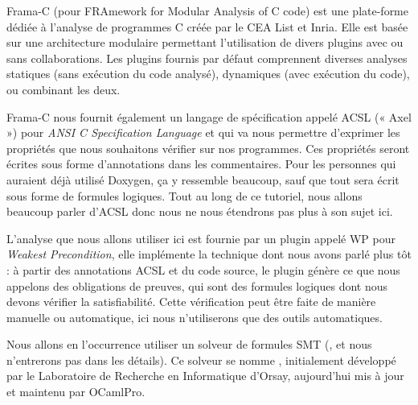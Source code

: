 

\begin{center}


\end{center}




Frama-C (pour FRAmework for Modular Analysis of C code) est une plate-forme
 dédiée à l'analyse de programmes C créée par le CEA List et Inria. Elle est 
 basée sur une architecture modulaire permettant l'utilisation de divers 
 plugins avec ou sans collaborations. Les plugins fournis par défaut 
 comprennent diverses analyses statiques (sans exécution du code analysé), 
 dynamiques (avec exécution du code), ou combinant les deux.



Frama-C nous fournit également un langage de spécification appelé ACSL (« Axel »)
pour \textit{ANSI C Specification Language} et qui va nous permettre d'exprimer les 
propriétés que nous souhaitons vérifier sur nos programmes. Ces propriétés seront
écrites sous forme d'annotations dans les commentaires. Pour les personnes qui 
auraient déjà utilisé Doxygen, ça y ressemble beaucoup, sauf que tout sera 
écrit sous forme de formules logiques. Tout au long de ce tutoriel, nous allons 
beaucoup parler d'ACSL donc nous ne nous étendrons pas plus à son sujet ici.



L'analyse que nous allons utiliser ici est fournie par un plugin appelé WP pour
\textit{Weakest Precondition}, elle implémente la technique dont nous avons parlé plus tôt : 
à partir des annotations ACSL et du code source, le plugin génère ce que nous 
appelons des obligations de preuves, qui sont des formules logiques dont nous
devons vérifier la satisfiabilité. Cette vérification peut être faite de manière 
manuelle ou automatique, ici nous n'utiliserons que des outils automatiques.



Nous allons en l'occurrence utiliser un solveur de formules SMT
(,
et nous n'entrerons pas dans les détails). Ce solveur se nomme 
, initialement développé par le Laboratoire
de Recherche en Informatique d'Orsay, aujourd'hui mis à jour et maintenu par
OCamlPro.





